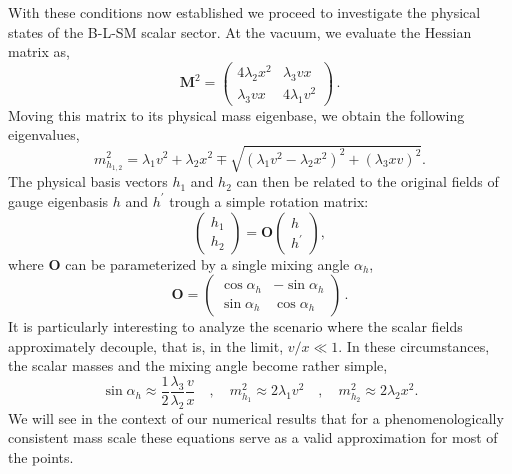 With these conditions now established we proceed to investigate the physical states of the B-L-SM scalar sector. 
%
At the vacuum, we evaluate the Hessian matrix as,
%
\begin{equation}
\mathbf{M}^2 =
\begin{pmatrix}
4 \lambda_2 x^2 & \lambda_3 v x \\ 
\lambda_3 v x   & 4 \lambda_1 v^2 
\end{pmatrix}\,.
\label{eq:hess}
\end{equation}
% 
Moving this matrix to its physical mass eigenbase, we obtain the following eigenvalues,
%
\begin{equation}
m_{h_{1,2}}^2 = \lambda_1 v^2 + \lambda_2 x^2 \mp \sqrt{(\lambda_1 v^2 - \lambda_2 x^2)^2 + (\lambda_3 x v)^2}.
\label{eq:eigvals}
\end{equation}
The physical basis vectors $h_1$ and $h_2$ can then be related to the original fields of gauge eigenbasis $h$ and $h^\prime$ trough a simple rotation matrix:
%
\begin{equation}
	\begin{pmatrix}
	h_1 \\
	h_2 
	\end{pmatrix}
	=
	\mathbf{O}
	\begin{pmatrix}
	h \\
	h^\prime 
	\end{pmatrix},
	\label{eq:trans}
\end{equation}
%
where $\mathbf{O}$ can be parameterized by a single mixing angle $\alpha_h$,
%
\begin{equation}
	\mathbf{O} = 
	\begin{pmatrix}
	\cos \alpha_h & -\sin \alpha_h \\
	\sin \alpha_h & \cos \alpha_h 
	\end{pmatrix}\,.
	\label{eq:rotmat}
\end{equation}
%
%
It is particularly interesting to analyze the scenario where the scalar fields approximately decouple, that is, in the limit, $v/x\ll 1$. In these circumstances, the scalar masses and the mixing angle become rather simple,
\begin{equation}
\sin \alpha_h \approx \dfrac{1}{2}\dfrac{\lambda_3}{\lambda_2} \dfrac{v}{x} \quad , \quad 
m_{h_1}^2 \approx 2 \lambda_1 v^2 \quad , \quad m_{h_2}^2 \approx 2 \lambda_2 x^2
\label{eq:simplify} .
\end{equation}
%
We will see in the context of our numerical results that for a phenomenologically consistent mass scale these equations serve as a valid approximation for most of the points. 


